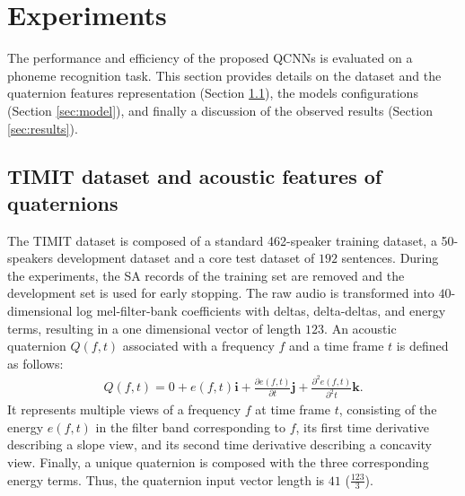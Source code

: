 \documentclass[a4paper]{article}
\def\i{\textbf{i}}
\def\j{\textbf{j}}
\def\k{\textbf{k}}
\begin{document}


\section{Experiments}
\label{sec:exps}
The performance and efficiency of the proposed QCNNs is evaluated on a phoneme recognition task. This section provides details on the dataset and the quaternion features representation (Section \ref{sec:dataset}), the models configurations (Section \ref{sec:model}), and finally a discussion of the observed results (Section \ref{sec:results}).

\subsection{TIMIT dataset and acoustic features of quaternions}
\label{sec:dataset}
The TIMIT \cite{garofolo1993darpa} dataset is composed of a standard 462-speaker training dataset, a 50-speakers development dataset and a core test dataset of $192$ sentences. During the experiments, the SA records of the training set are removed and the development set is used for early stopping. The raw audio is transformed into $40$-dimensional log mel-filter-bank coefficients with deltas, delta-deltas, and energy terms, resulting in a one dimensional vector of length $123$. An acoustic quaternion $Q(f,t)$ associated with a frequency $f$ and a time frame $t$ is defined as follows:
\begin{align}
Q(f,t) = 0 + e(f,t)\i + \frac{\partial e(f,t)}{\partial t} \j + \frac{\partial^2 e(f,t)}{\partial^2 t} \k.
\end{align}
It represents multiple views of a frequency $f$ at time frame $t$, consisting of the energy $e(f,t)$ in the filter band corresponding to $f$, its first time derivative describing a slope view, and its second time derivative describing a concavity view. Finally, a unique quaternion is composed with the three corresponding energy terms. Thus, the quaternion input vector length is $41$ ($\frac{123}{3}$). 
\end{document}

